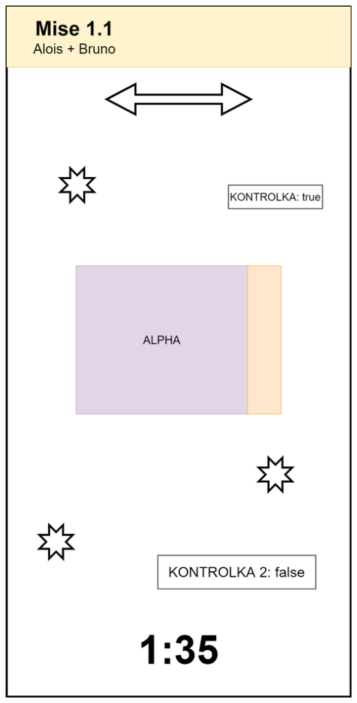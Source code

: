 \documentclass[czech,aspectratio=169]{beamer}
\begin{document}
\begin{frame}
\begin{columns}
\begin{column}{.25\textwidth}
\begin{center}
          \includegraphics[width=.9\textwidth]{assets/slides/screen-3}
        \end{center}
      \end{column}
    \end{columns}
  \end{frame}
\end{document}
